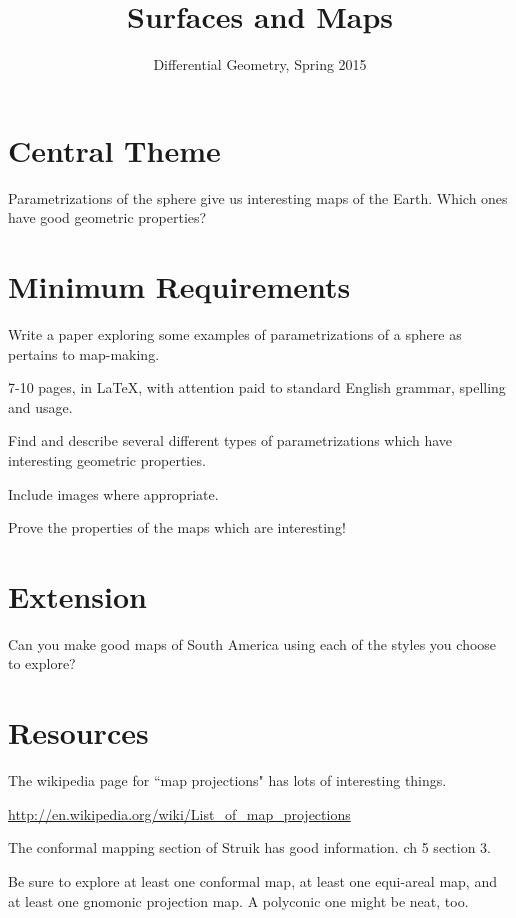 \documentclass[12pt]{amsart}
\begin{document}
\title{Surfaces and Maps}
\author{Differential Geometry, Spring 2015}

\maketitle

\section*{Central Theme}

Parametrizations of the sphere give us interesting maps of the Earth. Which ones have good geometric properties?

\section*{Minimum Requirements}

Write a paper exploring some examples of parametrizations of a sphere as pertains to map-making. 
\begin{compactitem}
\item 7-10 pages, in \LaTeX, with attention paid to standard English grammar, spelling and usage.
\item Find and describe several different types of parametrizations which have interesting geometric properties.
\item Include images where appropriate.
\item Prove the properties of the maps which are interesting!
\end{compactitem}

\section*{Extension}

Can you make good maps of South America using each of the styles you choose to explore?

\section*{Resources}

The wikipedia page for ``map projections" has lots of interesting things. 

\url{http://en.wikipedia.org/wiki/List_of_map_projections}

The conformal mapping section of Struik has good information. ch 5 section 3.

Be sure to explore at least one conformal map, at least one equi-areal map, and at least one gnomonic projection map. A polyconic one might be neat, too.
\end{document}

